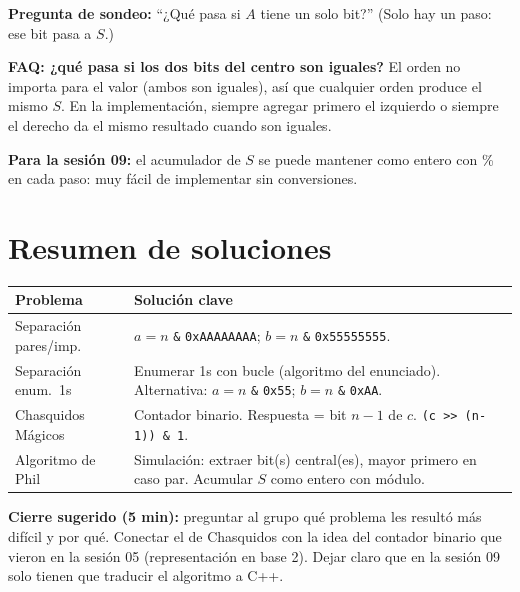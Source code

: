 \documentclass[12pt, oneside]{article}
\begin{document}
\begin{notaprofesor}
  \textbf{Pregunta de sondeo:} ``¿Qué pasa si $A$ tiene un solo bit?''
  (Solo hay un paso: ese bit pasa a $S$.)

  \textbf{FAQ: ¿qué pasa si los dos bits del centro son iguales?}
  El orden no importa para el valor (ambos son iguales), así que cualquier
  orden produce el mismo $S$.  En la implementación, siempre agregar primero
  el izquierdo o siempre el derecho da el mismo resultado cuando son iguales.

  \textbf{Para la sesión 09:} el acumulador de $S$ se puede mantener como
  entero con \% en cada paso: muy fácil de implementar sin conversiones.
\end{notaprofesor}

\section{Resumen de soluciones}

\begin{center}
\begin{tabular}{lp{8cm}}
  \toprule
  \textbf{Problema} & \textbf{Solución clave} \\
  \midrule
  Separación pares/imp.
    & $a = n$ \texttt{\&} \texttt{0xAAAAAAAA};
      $b = n$ \texttt{\&} \texttt{0x55555555}. \\[4pt]
  Separación enum.\ 1s
    & Enumerar 1s con bucle (algoritmo del enunciado).
      Alternativa: $a = n$ \texttt{\&} \texttt{0x55}; $b = n$ \texttt{\&} \texttt{0xAA}. \\[4pt]
  Chasquidos Mágicos
    & Contador binario. Respuesta = bit $n-1$ de $c$.
      \texttt{(c >> (n-1)) \& 1}. \\[4pt]
  Algoritmo de Phil
    & Simulación: extraer bit(s) central(es), mayor primero en caso par.
      Acumular $S$ como entero con módulo. \\
  \bottomrule
\end{tabular}
\end{center}

\begin{notaprofesor}
  \textbf{Cierre sugerido (5 min):} preguntar al grupo qué problema les
  resultó más difícil y por qué.  Conectar el de Chasquidos con la idea del
  contador binario que vieron en la sesión 05 (representación en base 2).
  Dejar claro que en la sesión 09 solo tienen que traducir el algoritmo a C++.
\end{notaprofesor}
\end{document}
